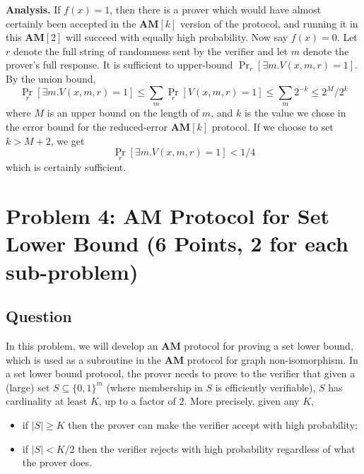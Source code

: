 \documentclass{article}
\newcommand{\AM}{\mathbf{AM}}
\begin{document}
\medskip
\noindent \textbf{Analysis.} If $f(x) = 1$, then there is a prover which would have almost certainly been accepted in the $\AM[k]$ version of the protocol, and running it in this $\AM[2]$ will succeed with equally high probability.
Now say $f(x) = 0$.  Let $r$ denote the full string of randomness sent by the verifier and let $m$ denote the prover's full response.
It is sufficient to upper-bound $\Pr_r[\exists m . V(x, m, r) = 1]$.
By the union bound,
$$
\Pr_r[\exists m . V(x, m, r) = 1] \leq \sum_{m}{\Pr_r[V(x, m, r) = 1]} \leq \sum_m{2^{-k}} \leq 2^M/2^k
$$
where $M$ is an upper bound on the length of $m$, and $k$ is the value we chose in the error bound for the reduced-error $\AM[k]$ protocol.
If we choose to set $k > M + 2$, we get 
$$
\Pr_r[\exists m . V(x, m, r) = 1] < 1/4
$$
which is certainly sufficient.


\newpage

\section*{Problem 4: AM Protocol for Set Lower Bound (6 Points, 2 for each sub-problem)}

\subsection*{Question}

In this problem, we will develop an $\AM$ protocol for proving a set lower bound, which is used as a subroutine in the $\AM$ protocol for graph non-isomorphism. In a set lower bound protocol, the prover needs to prove to the verifier that given a (large) set $S\subseteq \{0,1\}^m$ (where membership in $S$ is efficiently verifiable), $S$ has cardinality at least $K$, up to a factor of $2$. More precisely, given any $K$,
\begin{itemize}
\item  if $|S| \ge K$ then the prover can make the verifier accept with high probability; 
\item if $|S| < K/2$ then the verifier rejects with high probability regardless of what the prover does.
\end{itemize}
\end{document}
